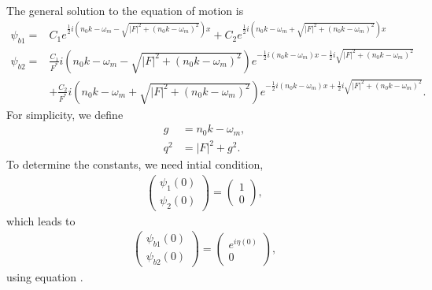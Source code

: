 \documentclass[letterpaper,12pt,english]{sphinxmanual}
\begin{document}
The general solution to the equation of motion is
\begin{equation*}
\begin{split}\psi_{b1} = & C_1 e^{\frac{1}{2} i \left( n_0 k -\omega_m - \sqrt{  \lvert F \rvert^2 +  (n_0 k -\omega_m)^2 } \right)x} + C_2 e^{\frac{1}{2} i \left( n_0 k -\omega_m + \sqrt{  \lvert F \rvert^2 +  (n_0 k -\omega_m)^2 } \right)x} \\
\psi_{b2} = & \frac{C_1}{F^*} i \left( n_0 k - \omega_m - \sqrt{ \lvert F\rvert^2 + ( n_0 k - \omega_m )^2 } \right) e^{ -\frac{1}{2}i (n_0 k - \omega_m ) x - \frac{1}{2} i \sqrt{ \lvert F \rvert^2 + (n_0 k - \omega_m )^2 }  } \\
& + \frac{C_2}{F^*} i \left( n_0 k - \omega_m + \sqrt{ \lvert F\rvert^2 + ( n_0 k - \omega_m )^2 }  \right)   e^{ -\frac{1}{2}i (n_0 k - \omega_m ) x + \frac{1}{2} i \sqrt{ \lvert F \rvert^2 + (n_0 k - \omega_m )^2 }  } .\end{split}
\end{equation*}
For simplicity, we define
\label{\detokenize{matter-stimulated/single-frequency:equation-definition-g-q}}\begin{equation}\label{equation:matter-stimulated/single-frequency:definition-g-q}
\begin{split}g &= n_0 k  - \omega_m, \\
q^2 &= \lvert F \rvert^2 + g^2.\end{split}
\end{equation}
To determine the constants, we need intial condition,
\begin{equation*}
\begin{split}\begin{pmatrix} \psi_1 (0) \\ \psi_2(0)  \end{pmatrix} = \begin{pmatrix} 1 \\ 0  \end{pmatrix} ,\end{split}
\end{equation*}
which leads to
\begin{equation*}
\begin{split}\begin{pmatrix} \psi_{b1} (0) \\ \psi_{b2}(0)  \end{pmatrix} = \begin{pmatrix} e^{i\eta(0)} \\ 0  \end{pmatrix},\end{split}
\end{equation*}
using equation {\hyperref[\detokenize{matter-stimulated/index:matter-stimulated-equation-wavefunction-diff-basis}]{}}.
\end{document}
